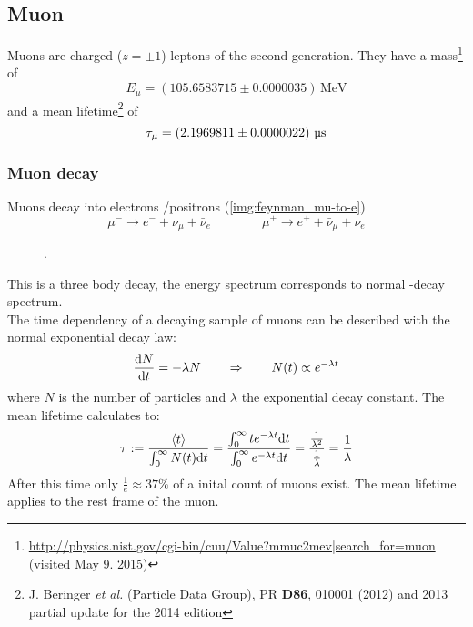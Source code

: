 \subsection{Muon}
Muons are charged ($z=\pm1$) leptons of the second generation. They have a mass\footnote{\url{http://physics.nist.gov/cgi-bin/cuu/Value?mmuc2mev|search_for=muon} (visited May 9. 2015)} of 
\begin{equation}
	\label{eq:litval:mass}
    E_\mu = (105.6583715 \pm 0.0000035)\,\text{MeV}
\end{equation}
and a mean lifetime\footnote{J. Beringer \emph{et al.} (Particle Data Group), PR \textbf{D86}, 010001 (2012) and 2013 partial update for the 2014 edition} of 
\begin{equation}
	\label{eq:litval:meanlifetime}
    \tau_\mu = \left( 2.1969811 \pm 0.0000022 \right)\,\text{\textmu s}
\end{equation}
\subsubsection{Muon decay}
\label{sub:decay}
Muons decay into electrons /positrons (\autoref{img:feynman_mu-to-e})
\begin{equation}
	\mu^- \rightarrow e^- + \nu_\mu + \bar{\nu}_e \qquad \qquad \mu^+ \rightarrow e^+ + \bar{\nu}_\mu + \nu_e
\end{equation}
\begin{figure}[H]
        \centering
        \def\svgwidth{0.35\textwidth}
       
        \caption{.}%
        \label{img:feynman_mu-to-e}
\end{figure}
This is a three body decay, the energy spectrum corresponds to normal \textbeta-decay spectrum. \\
The time dependency of a decaying sample of muons can be described with the normal exponential decay law:
\begin{equation}
	\label{eq:expdecay}
	\frac{\mathrm{d} N}{\mathrm{d} t} = - \lambda N \qquad \Rightarrow \qquad N(t) \propto e^{-\lambda t}
\end{equation}
where $N$ is the number of particles and $\lambda$ the exponential decay constant. The mean lifetime calculates to:
\begin{equation}
    \tau := \frac{\left<t\right>}{\int_0^\infty N(t) \mathrm{d} t} = 
    \frac{\int_0^\infty t e^{-\lambda t} \mathrm{d} t}{\int_0^\infty e^{-\lambda t} \mathrm{d} t} = 
    \frac{\frac{1}{\lambda^2}}{\frac{1}{\lambda}} = \frac{1}{\lambda}
\end{equation}
After this time only $\frac{1}{e} \approx 37\%$ of a inital count of muons exist. The mean lifetime applies to the rest frame of the muon.
